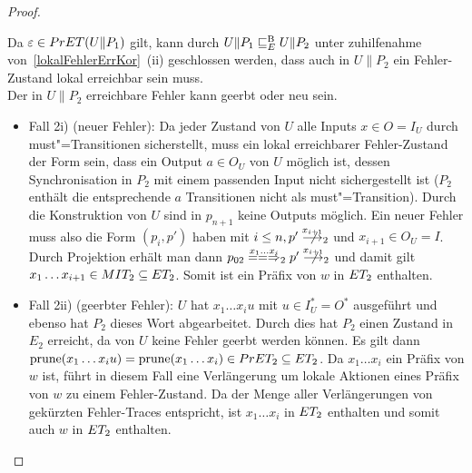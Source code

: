 \begin{proof}
\begin{itemize}
      Da $\varepsilon\in PrET (U\|P_1)$ gilt, kann durch $U\|P_1 \sqsubseteq  _E^\mathrm{B} U\|P_2$
      unter zuhilfenahme von~\ref{lokalFehlerErrKor}~(ii) geschlossen werden,
      dass auch in $U\|P_2$ ein Fehler-Zustand lokal erreichbar sein muss.\\
      Der in $U\|P_2$ erreichbare Fehler kann geerbt oder neu sein.
      \begin{itemize}
        \item Fall 2i) (neuer Fehler): Da jeder Zustand von $U$ alle Inputs
          $x\in O=I_U$ durch must"=Transitionen sicherstellt, muss ein lokal
          erreichbarer Fehler-Zustand der Form sein, dass ein Output $a\in O_U$
          von $U$ möglich ist, dessen Synchronisation in $P_2$ mit einem
          passenden Input nicht sichergestellt ist ($P_2$ enthält die
          entsprechende $a$ Transitionen nicht als must"=Transition). Durch die
          Konstruktion von $U$ sind in $p_{n+1}$ keine Outputs möglich. Ein
          neuer Fehler muss also die Form $(p_i,p')$ haben mit $i\leq
          n, p'\nmust[x_{i+1}]_2$ und $x_{i+1}\in O_U=I$. Durch Projektion
          erhält man dann $p_{02}\lweakmay[x_1\dots x_i]_2p'\nmust[x_{i+1}]_2$
          und damit gilt $x_1\dots x_{i+1}\in MIT _2\subseteq ET _2$. Somit
          ist ein Präfix von $w$ in $ET _2$ enthalten.
        \item Fall 2ii) (geerbter Fehler): $U$ hat $x_1\dots x_iu$ mit $u\in
          I_U^*=O^*$ ausgeführt und ebenso hat $P_2$ dieses Wort abgearbeitet.
          Durch dies hat $P_2$ einen Zustand  in $E_2$ erreicht, da von $U$
          keine Fehler geerbt werden können. Es gilt dann $\mathrm{prune} (x_1\dots
          x_iu) = \mathrm{prune} (x_1\dots x_i)\in PrET _2\subseteq ET _2$. Da
          $x_1\dots x_i$ ein Präfix von $w$ ist, führt in diesem Fall eine
          Verlängerung um lokale Aktionen eines Präfix von $w$ zu einem
          Fehler-Zustand. Da \ET{} der Menge aller Verlängerungen von gekürzten
          Fehler-Traces entspricht, ist $x_1\dots x_i$ in $ET
          _2$ enthalten und somit auch $w$ in $ET _2$ enthalten.
      \end{itemize}
  \end{itemize}


\end{proof}

